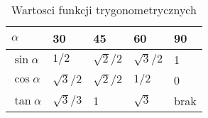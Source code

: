 \begin{table}[htbp]
\centering
\begin{tabular}{|l|l|l|l|l|}
\hline
$\alpha$  & 30            & 45              & 60            & 90 \\ \hline
$\sin\alpha$ & $1/2$       & $\sqrt{2}/2$    & $\sqrt{3}/2$  & 1   \\ \hline
$\cos\alpha$ & $\sqrt{3}/2$ & $\sqrt{2}/2$    & $1/2$         & 0   \\ \hline
$\tan\alpha$ & $\sqrt{3}/3$ & 1               & $\sqrt{3}$    & brak \\ \hline
\end{tabular}
\caption{Wartosci funkcji trygonometrycznych}
\label{tab:tryg}
\end{table}